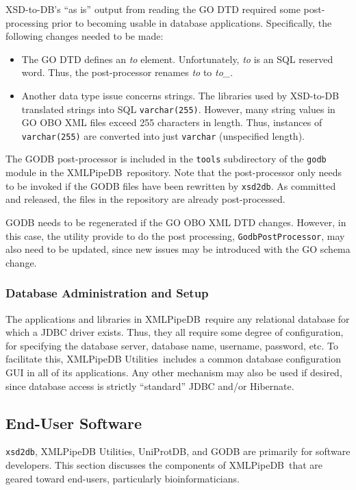 \documentclass[10pt]{bmc_article}
\newenvironment{bmcformat}{\begin{raggedright}\baselineskip20pt\sloppy\setboolean{publ}{false}}{\end{raggedright}\baselineskip20pt\sloppy}
\def\xmlpipedb{XMLPipeDB}                       %
\def\xsd2db{\texttt{xsd2db}}
\def\xpdutils{XMLPipeDB Utilities}
\begin{document}
\begin{bmcformat}
XSD-to-DB's ``as is'' output from reading the GO DTD \cite{godtd} required some post-processing prior to becoming usable in database applications.  Specifically, the following changes needed to be made:
\begin{itemize}
\item The GO DTD defines an \textsl{to} element.  Unfortunately, \textsl{to} is an SQL reserved word.  Thus, the post-processor renames \textsl{to} to \textsl{to\_}.

\item Another data type issue concerns strings.  The libraries used by XSD-to-DB translated strings into SQL \texttt{varchar(255)}.  However, many string values in GO OBO XML files exceed 255 characters in length.  Thus, instances of \texttt{varchar(255)} are converted into just \texttt{varchar} (unspecified length).
\end{itemize}
The GODB post-processor is included in the \texttt{tools} subdirectory of the \texttt{godb} module in the \xmlpipedb\ repository.  Note that the post-processor only needs to be invoked if the GODB files have been rewritten by \xsd2db.  As committed and released, the files in the repository are already post-processed.\pb

GODB needs to be regenerated if the GO OBO XML DTD changes.  However, in this case, the utility provide to do the post processing, \texttt{GodbPostProcessor}, may also need to be updated, since new issues may be introduced with the GO schema change.\pb

\subsubsection*{Database Administration and Setup}

The applications and libraries in \xmlpipedb\ require any relational database for which a JDBC driver exists.  Thus, they all require some degree of configuration, for specifying the database server, database name, username, password, etc.  To facilitate this, \xpdutils\ includes a common database configuration GUI in all of its applications.  Any other mechanism may also be used if desired, since database access is strictly ``standard'' JDBC and/or Hibernate.\pb

\subsection*{End-User Software}
\label{endUserSoftware}

\xsd2db, \xpdutils, UniProtDB, and GODB are primarily for software developers.  This section discusses the components of \xmlpipedb\ that are geared toward end-users, particularly bioinformaticians.\pb


\end{bmcformat}
\end{document}
